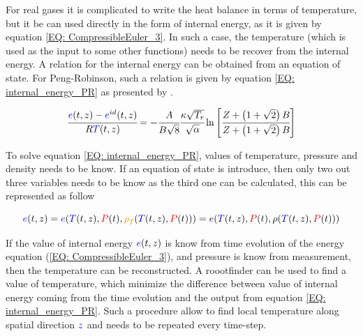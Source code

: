 \documentclass[../Article_Model_Parameters.tex]{subfiles}
\begin{document}
			For real gases it is complicated to write the heat balance in terms of temperature, but it be can used directly in the form of internal energy, as it is given by equation \ref{EQ: CompressibleEuler_3}. In such a case, the temperature (which is used as the input to some other functions) needs to be recover from the internal energy. A relation for the internal energy can be obtained from an equation of state. For Peng-Robinson, such a relation is given by equation \ref{EQ: internal_energy_PR} as presented by \citet{Elliott2011}.
			
		
			{\footnotesize
				\begin{equation}
					\cfrac{{\color{blue}e}(t,z)-{\color{blue}e}^{id}(t,z)}{R{\color{blue}T}(t,z)} = - \cfrac{A}{B\sqrt{8}} \cfrac{\kappa \sqrt{T_r}}{\sqrt{\alpha}} \ln \left[ \cfrac{Z+\left( 1+\sqrt{2} \right)B}{Z+\left( 1+\sqrt{2} \right)B} \right]
					\label{EQ: internal_energy_PR}
				\end{equation}
			}
			
			To solve equation \ref{EQ: internal_energy_PR}, values of temperature, pressure and density needs to be know. If an equation of state is introduce, then only two out three variables needs to be know as the third one can be calculated, this can be represented as follow
			
			{\footnotesize
			\begin{equation}
				{\color{blue}e}(t,z)={\color{blue}e}({\color{blue}T}(t,z),{\color{red}P}(t),{\color{orange}\rho_f}({\color{blue}T}(t,z),{\color{red}P}(t)))=e( {\color{blue}T}(t,z),{\color{red}P}(t), \rho({\color{blue}T}(t,z),{\color{red}P}(t)) ) 
			\end{equation}
			}
		
			If the value of internal energy ${\color{blue}e}(t,z)$ is know from time evolution of the energy equation (\ref{EQ: CompressibleEuler_3}), and pressure is know from measurement, then the temperature can be reconstructed. A roootfinder can be used to find a value of temperature, which minimize the difference between value of internal energy coming from the time evolution and the output from equation \ref{EQ: internal_energy_PR}. Such a procedure allow to find local temperature along spatial direction ${\color{blue}z}$ and needs to be repeated every time-step.
			
\end{document}

